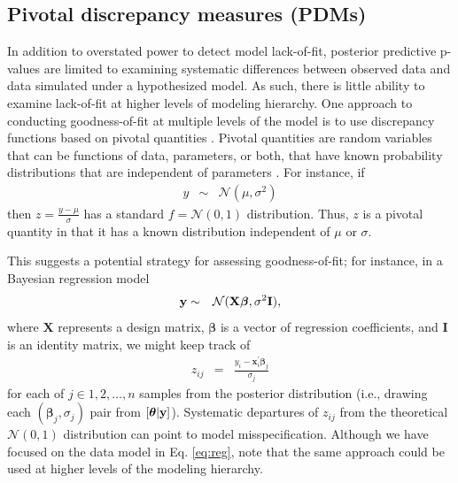 \documentclass[12pt,english]{article}
\begin{document}
\begin{spacing}{1.9}
\subsection{Pivotal discrepancy measures (PDMs)}

In addition to overstated power to detect model lack-of-fit, posterior predictive p-values are limited to examining systematic differences between observed data and data simulated under a hypothesized model.  As such, there is little ability to examine lack-of-fit at higher levels of modeling hierarchy.  One approach to conducting goodness-of-fit at multiple levels of the model is to use discrepancy functions based on pivotal quantities \citep{Johnson2004,YuanJohnson2012}.  Pivotal quantities are random variables that can be functions of data, parameters, or both, that have known probability distributions that are independent of parameters \citep[see e.g.,][section 9.2.2]{CasellaBerger1990}.  For instance, if
\begin{eqnarray*}
  y & \sim & \mathcal{N}(\mu,\sigma^2)
\end{eqnarray*}
then $z = \frac{y-\mu}{\sigma}$ has a standard $f=\mathcal{N}(0,1)$ distribution. Thus, $z$ is a pivotal quantity in that it has a known distribution independent of $\mu$ or $\sigma$.

This suggests a potential strategy for assessing goodness-of-fit; for instance, in a Bayesian regression model
\begin{eqnarray}
  \label{eq:reg}
  {\bf y} & \sim & \mathcal{N}(\textbf{X} \boldsymbol{\beta},\sigma^2 \textbf{I}),
\end{eqnarray}
where $\textbf{X}$ represents a design matrix, $\boldsymbol{\beta}$ is a vector of regression coefficients, and $\textbf{I}$ is an identity matrix, we might keep track of
\begin{eqnarray}
  \label{eq:resid}
  z_{ij} & = & \frac{y_i - \textbf{x}_i^\prime \boldsymbol{\beta}_j}{\sigma_j}
\end{eqnarray}
for each of $j \in {1, 2, \hdots, n}$ samples from the posterior distribution (i.e., drawing each $(\boldsymbol{\beta}_j, \sigma_j)$ pair from  $[\boldsymbol{\theta}|{\bf y}]$).  Systematic departures of $z_{ij}$ from the theoretical $\mathcal{N}(0,1)$ distribution can point to model misspecification.  Although we have focused on the data model in Eq. \ref{eq:reg}, note that the same approach could be used at higher levels of the modeling hierarchy.


\end{spacing}
\end{document}
